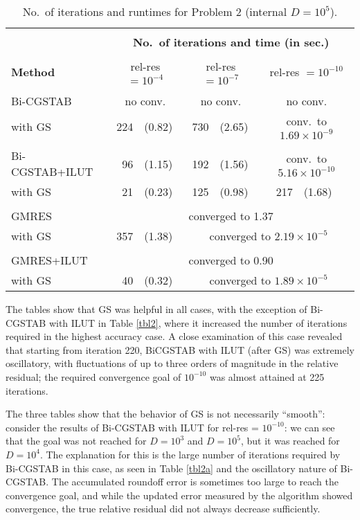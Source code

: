 \documentclass[12pt,a4paper]{article}
\newcounter{i}
\def\time{\!\times\!}
\def\noconv{\multicolumn{2}{|c|}{no conv.}}
\begin{document}
\begin{table}[!h]
\centering
\begin{tabular}{|l|rl|rl|rl|}
\hline
&\multicolumn{6}{|c|}{}\\[-12pt]
&\multicolumn{6}{|c|}{\bf No.\ of iterations and time (in sec.)}\\
\hline&&&&&&\\[-11pt]
{\bf Method} & \multicolumn{2}{|c|}{rel-res $=\!10^{-4}$}
& \multicolumn{2}{|c|}{rel-res $=\!10^{-7}$}
& \multicolumn{2}{|c|}{rel-res $=\!10^{-10}$} \\
\hline&&&&&&\\[-12pt]
Bi-CGSTAB       & \noconv      & \noconv      & \noconv      \\
with GS         & 224 & (0.82) & 730 & (2.65) & 
\multicolumn{2}{|c|}{conv.\ to $1.69\time10^{-9}$} \\
\hline&&&&&&\\[-12pt]
Bi-CGSTAB+ILUT  & 96  & (1.15) & 192 & (1.56) & 
\multicolumn{2}{|c|}{conv.\ to $5.16\time10^{-10}$} \\
with GS         & 21  & (0.23) & 125 & (0.98) & 217 & (1.68) \\
\hline
&\multicolumn{6}{|c|}{}\\[-12pt]
GMRES & \multicolumn{6}{|c|}{converged to 1.37} \\
with GS & 357 & (1.38) & 
\multicolumn{4}{|c|}{converged to $2.19\time10^{-5}$} \\
\hline
&\multicolumn{6}{|c|}{}\\[-12pt]
GMRES+ILUT & \multicolumn{6}{|c|}{converged to 0.90} \\
with GS    & 40 & (0.32) & 
\multicolumn{4}{|c|}{converged to $1.89\time10^{-5}$} \\
\hline
\end{tabular}
\caption{No.\ of iterations and runtimes for Problem 2 
(internal $D=10^5$).}
\label{tbl2b}
\end{table}

The tables show that GS was helpful in all cases, with the
exception of Bi-CGSTAB with ILUT in Table \ref{tbl2}, where
it increased the number of iterations required in the highest
accuracy case.  A close examination of this case revealed that
starting from iteration 220, BiCGSTAB with ILUT (after GS) was
extremely oscillatory, with fluctuations of up to three orders
of magnitude in the relative residual; the required convergence 
goal of $10^{-10}$ was almost attained at 225 iterations.

The three tables show that the behavior of GS is not necessarily 
``smooth'': consider the results of Bi-CGSTAB with ILUT for 
rel-res = $10^{-10}$: we can see that the goal was not reached 
for $D=10^3$ and $D=10^5$, but it was reached for $D=10^4$.  The 
explanation for this is the large number of iterations required
by Bi-CGSTAB in this case, as seen in Table \ref{tbl2a} and the
oscillatory nature of Bi-CGSTAB.  The accumulated roundoff error 
is sometimes too large to reach the convergence goal, and while 
the updated error measured by the algorithm showed convergence, 
the true relative residual did not always decrease sufficiently.
\end{document}
